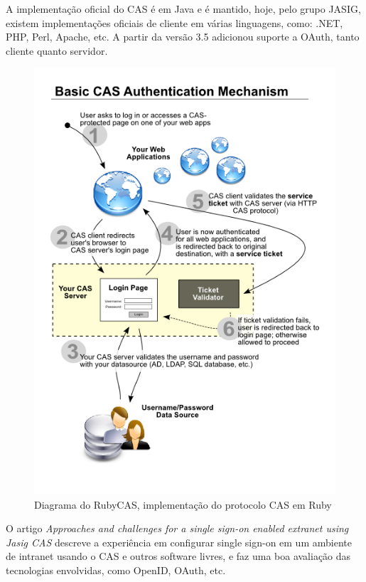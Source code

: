 \documentclass[11pt]{article}
\begin{document}
A implementação oficial do CAS é em Java e é mantido, hoje, pelo grupo
JASIG\cite{jasigSite}, existem implementações oficiais de cliente em várias
linguagens, como: .NET, PHP, Perl, Apache, etc.  A partir da versão 3.5
adicionou suporte a OAuth\cite{oauthJasig}, tanto cliente quanto servidor.

\begin{figure}[h]
\center
\includegraphics[scale=0.4]{sso-rubycas.png}
\caption{Diagrama do RubyCAS, implementação do protocolo CAS em Ruby}
\label{fig:sso-rubycas}
\end{figure}

O artigo {\it Approaches and challenges for a single sign-on enabled extranet
using Jasig CAS}\cite{approachesAndChallengesSSO} descreve a experiência em
configurar single sign-on em um ambiente de intranet usando o CAS e outros
software livres, e faz uma boa avaliação das tecnologias envolvidas, como
OpenID, OAuth, etc.
\end{document}
